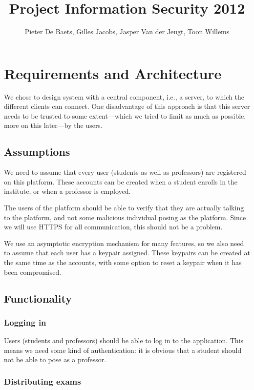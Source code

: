 \documentclass{article}
\title{Project Information Security 2012}
\author{Pieter De Baets, Gilles Jacobs, Jasper Van der Jeugt, Toon Willems}
\begin{document}
\maketitle
\tableofcontents

\newpage

\section{Requirements and Architecture}

We chose to design system with a central component, i.e., a server, to which the
different clients can connect. One disadvantage of this approach is that this
server needs to be trusted to some extent---which we tried to limit as much as
possible, more on this later---by the users.

\subsection{Assumptions}

We need to assume that every user (students as well as professors) are
registered on this platform. These accounts can be created when a student
enrolls in the institute, or when a professor is employed.

The users of the platform should be able to verify that they are actually
talking to the platform, and not some malicious individual posing as the
platform. Since we will use HTTPS for all communication, this should not be a
problem.

We use an asymptotic encryption mechanism for many features, so we also need to
assume that each user has a keypair assigned. These keypairs can be created at
the same time as the accounts, with some option to reset a keypair when it has
been compromised.

\subsection{Functionality}

\subsubsection{Logging in}

Users (students and professors) should be able to log in to the application.
This means we need some kind of authentication: it is obvious that a student
should not be able to pose as a professor.

\subsubsection{Distributing exams}
\end{document}
